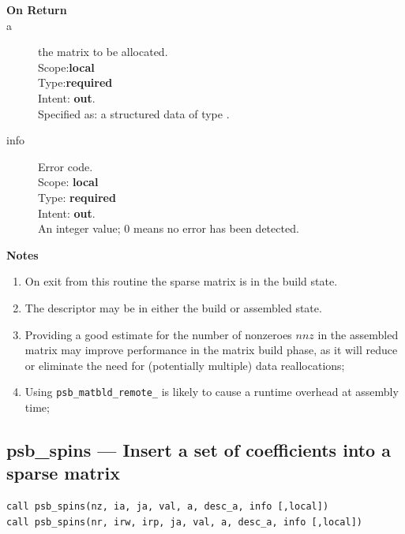 \begin{description}
\item[\bf On Return]
\item[a] the matrix to be allocated.\\
Scope:{\bf local}\\
Type:{\bf required}\\
Intent: {\bf out}.\\
Specified as: a structured data of type \spdata.
\item[info] Error code.\\
Scope: {\bf local} \\
Type: {\bf required} \\
Intent: {\bf out}.\\
An integer value; 0 means no error has been detected. 
\end{description}
{\par\noindent\large\bfseries Notes}
\begin{enumerate}
\item On exit from this routine the sparse matrix  is in the build
  state.
\item The descriptor may be in either the build or assembled state.
\item Providing a good estimate for the number of nonzeroes $nnz$ in
  the assembled matrix may improve performance in the
  matrix build phase, as it will reduce or eliminate the need for
  (potentially multiple) data reallocations;
\item Using \verb|psb_matbld_remote_| is likely to cause  a runtime  overhead at
  assembly time;
\end{enumerate}



%
%
\clearpage\subsection{psb\_spins --- Insert a set of coefficients into a sparse
  matrix}

\begin{verbatim}
call psb_spins(nz, ia, ja, val, a, desc_a, info [,local])
call psb_spins(nr, irw, irp, ja, val, a, desc_a, info [,local])
\end{verbatim}

